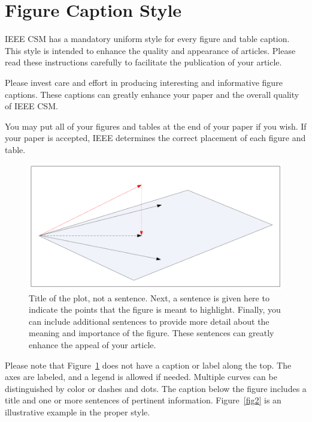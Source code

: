 \documentclass[letterpaper,12pt,peerreviewca,draftcls]{IEEEtran}
\begin{document}
\section{Figure Caption Style}


IEEE CSM has a mandatory uniform style for every figure and table
caption.  This style is intended to enhance the quality and
appearance of articles. Please read these instructions carefully
to facilitate the publication of your article.

Please invest care and effort in producing interesting and
informative figure captions.  These captions can greatly enhance
your paper and the overall quality of IEEE CSM.



You may put all of your figures and tables at the end of your
paper if you wish.  If your paper is accepted, IEEE determines the
correct placement of each figure and table.


\begin{figure}[t]
\centering
\includegraphics[scale=0.5]{sensitivity}
\caption{Title of the plot, not a sentence.  Next, a sentence is
given
  here to indicate the points that the figure is meant to
  highlight. Finally, you can include additional sentences to provide
  more detail about the meaning and importance of the figure.  These
  sentences can greatly enhance the appeal of your article.}
\label{fig1}
\end{figure}




Please note that Figure~\ref{fig1} does not have a caption or
label along the top.  The axes are labeled, and a legend is
allowed if needed. Multiple curves can be distinguished by color
or dashes and dots. The caption below the figure includes a title
and one or more sentences of pertinent information.
Figure~\ref{fig2} is an illustrative example in the proper style.
\end{document}
